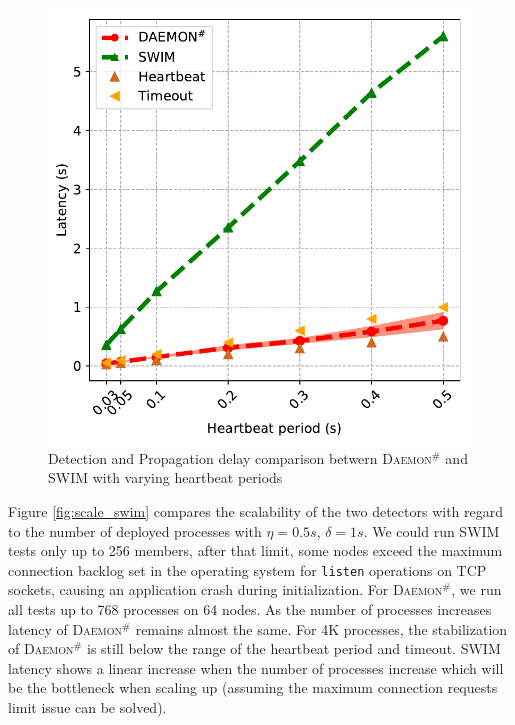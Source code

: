 \documentclass[sigconf]{acmart}
\newcommand{\ourwork}[0]{\textsc{Daemon}\ensuremath{^\#}\xspace}
\begin{document}
\begin{figure}[h]
  \centering
  \includegraphics[width=\linewidth]{HB_prrte_swim.pdf}
  \caption{Detection and Propagation delay comparison betwern \ourwork and SWIM with varying heartbeat periods}
  \label{fig:hb_prrte_swim}
\end{figure}


Figure \ref{fig:scale_swim} compares the scalability of the two detectors with regard to the number of deployed processes with $\eta = 0.5s$, $\delta = 1s$. 
We could run SWIM tests only up to 256 members, after that limit, some nodes exceed the maximum connection backlog 
set in the operating system for \texttt{listen} operations on TCP sockets, causing an application crash during 
initialization. For \ourwork,
we run all tests up to 768 processes on 64 nodes. 
%
As the number of processes increases latency of \ourwork remains almost the same. 
For 4K processes, the stabilization of \ourwork is still below the range of the heartbeat period and timeout.
SWIM latency shows a linear increase when the number of processes increase which will be the bottleneck when scaling up (assuming the maximum connection requests limit issue can be solved). 
\end{document}
